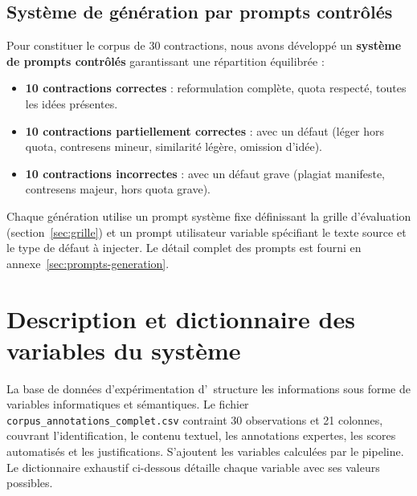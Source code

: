\subsection{Système de génération par prompts contrôlés}

Pour constituer le corpus de 30 contractions, nous avons développé un \textbf{système de prompts contrôlés} garantissant une répartition équilibrée :

\begin{itemize}
    \item \textbf{10 contractions correctes} : reformulation complète, quota respecté, toutes les idées présentes.
    \item \textbf{10 contractions partiellement correctes} : avec un défaut (léger hors quota, contresens mineur, similarité légère, omission d'idée).
    \item \textbf{10 contractions incorrectes} : avec un défaut grave (plagiat manifeste, contresens majeur, hors quota grave).
\end{itemize}

Chaque génération utilise un prompt système fixe définissant la grille d'évaluation (section~\ref{sec:grille}) et un prompt utilisateur variable spécifiant le texte source et le type de défaut à injecter. Le détail complet des prompts est fourni en annexe~\ref{sec:prompts-generation}.

\section{Description et dictionnaire des variables du système}

La base de données d'expérimentation d'\AZIZA\ structure les informations sous forme de variables informatiques et sémantiques. Le fichier \texttt{corpus\_annotations\_complet.csv} contraint 30 observations et 21 colonnes, couvrant l'identification, le contenu textuel, les annotations expertes, les scores automatisés et les justifications. S'ajoutent les variables calculées par le pipeline. Le dictionnaire exhaustif ci-dessous détaille chaque variable avec ses valeurs possibles.

